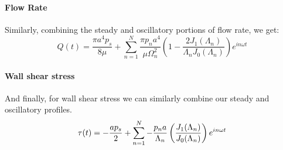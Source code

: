 \documentclass[11pt,letterpaper]{article}
\begin{document}
\paragraph{Flow Rate}
Similarly, combining the steady and oscillatory portions of flow rate, we get:
\[
    Q(t) = \frac{\pi a^4 p_s}{8 \mu} +\displaystyle \sum_{n=1}^N\frac{\pi p_n a^4}{\mu \Omega_n^2} \left(1 - \frac{2 J_1(\Lambda_n)}{\Lambda_n J_0(\Lambda_n)}\right)e^{i n \omega t} 
\] 
\paragraph{Wall shear stress}
And finally, for wall shear stress we can similarly combine our steady and oscillatory profiles.
\[
    \tau(t) = -\frac{a p_s}{2} +  \sum_{n=1}^{N}-\frac{p_n a}{\Lambda_n}\left(\frac{J_1(\Lambda_n)}{J_0(\Lambda_n)} \right) e^{i n \omega t}\\
\] 
\end{document}
